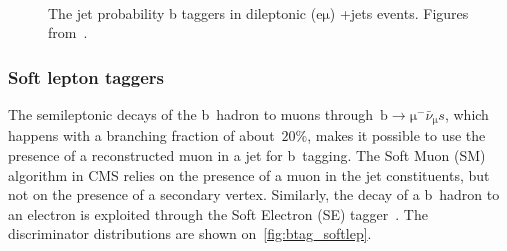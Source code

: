 \begin{figure}
\begin{centering}
 \\
\caption[The jet probability b discriminator distributions]{The jet probability b taggers in dileptonic ($\mathrm{e\mu}$) \ttbar+jets events. Figures from~\cite{CMS-PAS-BTV-15-001}.}
\label{fig:btag_jbp}
\end{centering}
\end{figure}

\subsubsection{Soft lepton taggers}
The semileptonic decays of the b~hadron to muons through~$\mathrm{b} \rightarrow \mathrm{\mu}^- \bar{\nu}_{\mathrm{\mu}} s$, which happens with a branching fraction of about~$20\%$, makes it possible to use the presence of a reconstructed muon in a jet for b~tagging. The Soft Muon (SM) algorithm in CMS relies on the presence of a muon in the jet constituents, but not on the presence of a secondary vertex. Similarly, the decay of a b~hadron to an electron is exploited through the Soft Electron (SE) tagger~\cite{CMS-PAS-BTV-15-001}. The discriminator distributions are shown on~\cref{fig:btag_softlep}.

